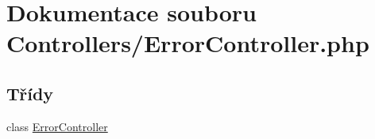\hypertarget{_error_controller_8php}{\section{Dokumentace souboru Controllers/\-Error\-Controller.php}
\label{_error_controller_8php}
}
\subsection*{Třídy}
\begin{DoxyCompactItemize}
\item 
class \hyperlink{class_error_controller}{Error\-Controller}
\end{DoxyCompactItemize}
